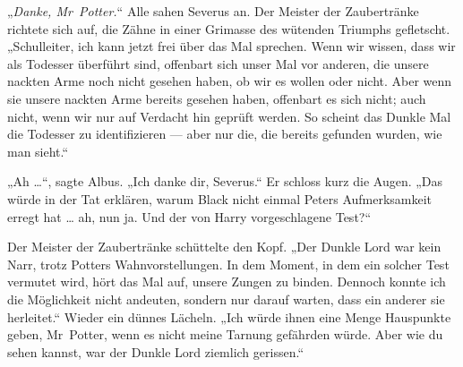 „\emph{Danke, Mr~Potter.}“ Alle sahen Severus an. Der Meister der Zaubertränke richtete sich auf, die Zähne in einer Grimasse des wütenden Triumphs gefletscht.
„Schulleiter, ich kann jetzt frei über das Mal sprechen. Wenn wir wissen, dass wir als Todesser überführt sind, offenbart sich unser Mal vor anderen, die unsere nackten Arme noch nicht gesehen haben, ob wir es wollen oder nicht. Aber wenn sie unsere nackten Arme bereits gesehen haben, offenbart es sich nicht; auch nicht, wenn wir nur auf Verdacht hin geprüft werden. So scheint das Dunkle Mal die Todesser zu identifizieren — aber nur die, die bereits gefunden wurden, wie man sieht.“

„Ah …“, sagte Albus.
„Ich danke dir, Severus.“ Er schloss kurz die Augen.
„Das würde in der Tat erklären, warum Black nicht einmal Peters Aufmerksamkeit erregt hat … ah, nun ja. Und der von Harry vorgeschlagene Test?“

Der Meister der Zaubertränke schüttelte den Kopf.
„Der Dunkle Lord war kein Narr, trotz Potters Wahnvorstellungen. In dem Moment, in dem ein solcher Test vermutet wird, hört das Mal auf, unsere Zungen zu binden. Dennoch konnte ich die Möglichkeit nicht andeuten, sondern nur darauf warten, dass ein anderer sie herleitet.“ Wieder ein dünnes Lächeln.
„Ich würde ihnen eine Menge Hauspunkte geben, Mr~Potter, wenn es nicht meine Tarnung gefährden würde. Aber wie du sehen kannst, war der Dunkle Lord ziemlich gerissen.“

